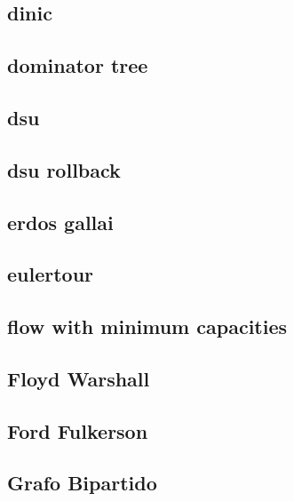 \subsection{dinic}
\raggedbottom
\hrulefill
\subsection{dominator tree}
\raggedbottom
\hrulefill
\subsection{dsu}
\raggedbottom
\hrulefill
\subsection{dsu rollback}
\raggedbottom
\hrulefill
\subsection{erdos gallai}
\raggedbottom
\hrulefill
\subsection{eulertour}
\raggedbottom
\hrulefill
\subsection{flow with minimum capacities}
\raggedbottom
\hrulefill
\subsection{Floyd Warshall}
\raggedbottom
\hrulefill
\subsection{Ford Fulkerson}
\raggedbottom
\hrulefill
\subsection{Grafo Bipartido}
\raggedbottom
\hrulefill
